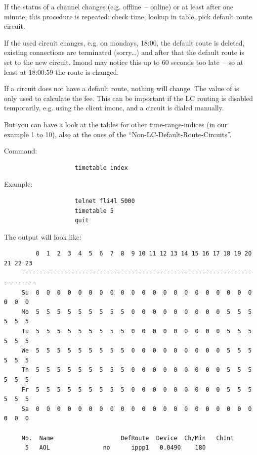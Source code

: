   If the status of a channel changes (e.g. offline~-- online) or at least
  after one minute, this procedure is repeated: check time, lookup
  in table, pick default route circuit.

  If the used circuit changes, e.g. on mondays, 18:00, the default route
  is deleted, existing connections are terminated (sorry\ldots) and after
  that the default route is set to the new circuit. Imond may notice this
  up to 60 seconds too late~-- so at least at 18:00:59 the route is
  changed.

  If a circuit does not have a default route, nothing will change. The value
  of  is only used to calculate the fee.
  This can be important if the LC routing is disabled temporarily, e.g. using
  the client imonc, and a circuit is dialed manually.

  But you can have a look at the tables for other time-range-indices
  (in our example 1 to 10), also at the ones of the
  ``Non-LC-Default-Route-Circuits''.

  Command:

\begin{example}
\begin{verbatim}
                    timetable index
\end{verbatim}
\end{example}

  Example:

\begin{example}
\begin{verbatim}
                    telnet fli4l 5000
                    timetable 5
                    quit
\end{verbatim}
\end{example}

  The output will look like:

\begin{example}
\begin{verbatim}
         0  1  2  3  4  5  6  7  8  9 10 11 12 13 14 15 16 17 18 19 20 21 22 23
     --------------------------------------------------------------------------
     Su  0  0  0  0  0  0  0  0  0  0  0  0  0  0  0  0  0  0  0  0  0  0  0  0
     Mo  5  5  5  5  5  5  5  5  5  0  0  0  0  0  0  0  0  0  5  5  5  5  5  5
     Tu  5  5  5  5  5  5  5  5  5  0  0  0  0  0  0  0  0  0  5  5  5  5  5  5
     We  5  5  5  5  5  5  5  5  5  0  0  0  0  0  0  0  0  0  5  5  5  5  5  5
     Th  5  5  5  5  5  5  5  5  5  0  0  0  0  0  0  0  0  0  5  5  5  5  5  5
     Fr  5  5  5  5  5  5  5  5  5  0  0  0  0  0  0  0  0  0  5  5  5  5  5  5
     Sa  0  0  0  0  0  0  0  0  0  0  0  0  0  0  0  0  0  0  0  0  0  0  0  0

     No.  Name                   DefRoute  Device  Ch/Min   ChInt
      5   AOL               no      ippp1   0.0490    180
\end{verbatim}
\end{example}

